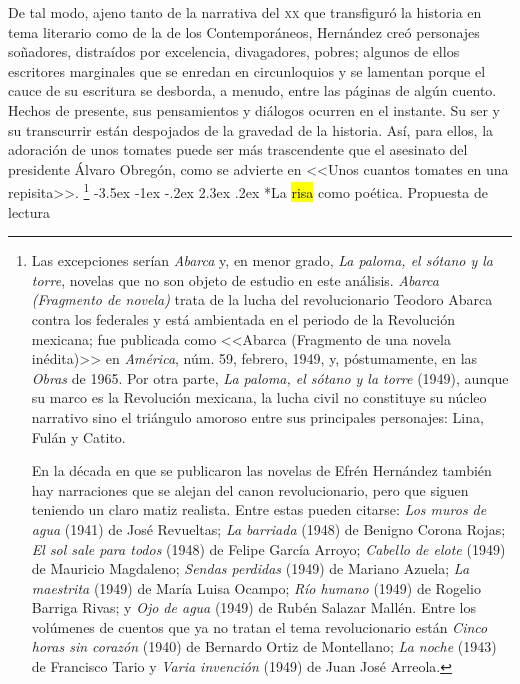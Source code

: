 \documentclass[14pt,twoside,final]{extbook} %
\makeatletter
\let\oldfootnote\footnote
\renewcommand\footnote[1]{%
\oldfootnote{\hspace{1mm}#1}}
\renewcommand\section{\@startsection {section}{1}{\z@}%
                                     {-3.5ex \@plus -1ex \@minus -.2ex}%
                                     {2.3ex \@plus .2ex}%
                                     {\normalfont\large\bfseries\sc}}
\makeatother
\begin{document}
De tal modo, ajeno tanto de la narrativa del \textsc{xx} que transfiguró la historia en tema literario como de la de los Contemporáneos, Hernández creó personajes soñadores, distraídos por excelencia, divagadores, pobres; algunos de ellos escritores marginales que se enredan en circunloquios y se lamentan porque el cauce de su escritura se desborda, a menudo, entre las páginas de algún cuento. Hechos de presente, sus pensamientos y diálogos ocurren en el instante. Su ser y su transcurrir están despojados de la gravedad de la historia. Así, para ellos, la adoración de unos tomates puede ser más trascendente que el asesinato del presidente Álvaro Obregón, como se advierte en <<Unos cuantos tomates en una repisita>>.\footnote{Las excepciones serían \emph{Abarca} y, en menor grado, \emph{La paloma, el sótano y la torre}, novelas que no son objeto de estudio en este análisis. \emph{Abarca (Fragmento de novela)} trata de la lucha del revolucionario Teodoro Abarca contra los federales y está ambientada en el periodo de la Revolución mexicana; fue publicada como <<Abarca (Fragmento de una novela inédita)>> en \emph{América}, núm. 59, febrero, 1949, y, póstumamente, en las \emph{Obras} de 1965. Por otra parte, \emph{La paloma, el sótano y la torre} (1949), aunque su marco es la Revolución mexicana, la lucha civil no constituye su núcleo narrativo sino el triángulo amoroso entre sus principales personajes: Lina, Fulán y Catito.

En la década en que se publicaron las novelas de Efrén Hernández también hay narraciones que se alejan del canon revolucionario, pero que siguen teniendo un claro matiz realista. Entre estas pueden citarse: \emph{Los muros de agua} (1941) de José Revueltas; \emph{La barriada} (1948) de Benigno Corona Rojas; \emph{El sol sale para todos} (1948) de Felipe García Arroyo; \emph{Cabello de elote} (1949) de Mauricio Magdaleno; \emph{Sendas perdidas} (1949) de Mariano Azuela; \emph{La maestrita} (1949) de María Luisa Ocampo; \emph{Río humano} (1949) de Rogelio Barriga Rivas; y \emph{Ojo de agua} (1949) de Rubén Salazar Mallén. Entre los volúmenes de cuentos que ya no tratan el tema revolucionario están \emph{Cinco horas sin corazón} (1940) de Bernardo Ortiz de Montellano; \emph{La noche} (1943) de Francisco Tario y \emph{Varia invención} (1949) de Juan José Arreola.}
\section*{La \hl{risa} como poética. Propuesta de lectura}\label{sec:la-risa-como-poetica-propuesta-de-lectura}
\end{document}

